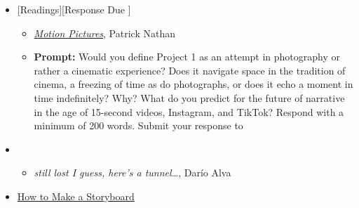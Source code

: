 \begin{itemize}[noitemsep,topsep=0pt,leftmargin=*]
    \item {}[Readings][Response Due \dThur]
          \begin{itemize}
              \item \href{https://reallifemag.com/motion-pictures/}{\emph{Motion Pictures}}, Patrick Nathan
              \item \textbf{Prompt:} Would you define Project 1 as an attempt in photography or rather a cinematic experience? Does it navigate space in the tradition of cinema, a freezing of time as do photographs, or does it echo a moment in time indefinitely? Why? What do you predict for the future of narrative in the age of 15-second videos, Instagram, and TikTok? Respond with a minimum of 200 words. Submit your response to \discordR
          \end{itemize}
    \item {}
          \begin{itemize}
              \item \emph{still lost I guess, here’s a tunnel\dots}, Darío Alva
          \end{itemize}
    \item {} \href{https://www.studiobinder.com/blog/how-to-make-storyboard/}{How to Make a Storyboard}
\end{itemize}